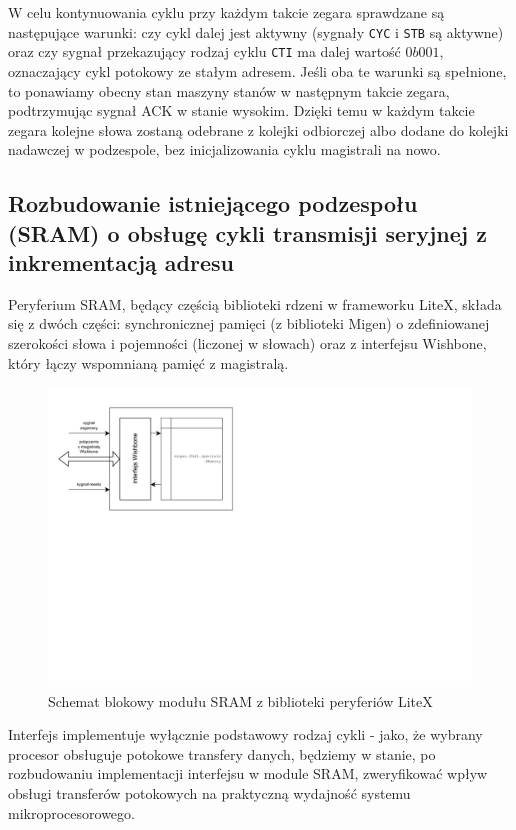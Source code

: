 W celu kontynuowania cyklu przy każdym takcie zegara sprawdzane są następujące warunki: czy cykl dalej jest aktywny (sygnały \texttt{CYC} i \texttt{STB} są aktywne) oraz czy sygnał przekazujący rodzaj cyklu \texttt{CTI} ma dalej wartość $0b001$, oznaczający cykl potokowy ze stałym adresem. Jeśli oba te warunki są spełnione, to ponawiamy obecny stan maszyny stanów w następnym takcie zegara, podtrzymując sygnał ACK w stanie wysokim. Dzięki temu w każdym takcie zegara kolejne słowa zostaną odebrane z kolejki odbiorczej albo dodane do kolejki nadawczej w podzespole, bez inicjalizowania cyklu magistrali na nowo.

\subsection{Rozbudowanie istniejącego podzespołu (SRAM) o obsługę cykli transmisji seryjnej z inkrementacją adresu}

Peryferium SRAM, będący częścią biblioteki rdzeni w frameworku LiteX, składa się z dwóch części: synchronicznej pamięci (z biblioteki Migen) o zdefiniowanej szerokości słowa i pojemności (liczonej w słowach) oraz z interfejsu Wishbone, który łączy wspomnianą pamięć z magistralą.

\begin{figure}[H]
    \centering
    \includegraphics[scale=1,trim={0.5cm 8.5cm 9.5cm 1cm},clip]{implementation/memory-peripheral-diag.pdf}
    \caption{Schemat blokowy modułu SRAM z biblioteki peryferiów LiteX}
    \label{fig:memory-peripheral-diag}
\end{figure}

Interfejs implementuje wyłącznie podstawowy rodzaj cykli - jako, że wybrany procesor obsługuje potokowe transfery danych, będziemy w stanie, po rozbudowaniu implementacji interfejsu w module SRAM, zweryfikować wpływ obsługi transferów potokowych na praktyczną wydajność systemu mikroprocesorowego.

